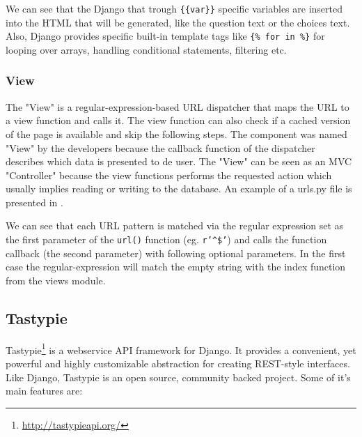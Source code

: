 

We can see that the Django that trough \texttt{\{\{var\}\}} specific variables are inserted into the HTML that will be generated, like the question text or the choices text. Also, Django provides specific built-in template tags like \texttt{\{\% for in \%\}} for looping over arrays, handling conditional statements, filtering etc.

\subsubsection{View}
\label{sub-sub-sec:view}

The "View" is a regular-expression-based URL dispatcher that maps the URL to a view function and calls it. The view function can also check if a cached version of the page is available and skip the following steps. The component was named "View" by the developers because the callback function of the dispatcher describes which data is presented to de user. The "View" can be seen as an MVC "Controller" because the view functions performs the requested action which usually implies reading or writing to the database. An example of a urls.py file is presented in .



We can see that each URL pattern is matched via the regular expression set as the first parameter of the \texttt{url()} function (eg. \texttt{r'\^{}\$'}) and calls the function callback (the second parameter) with following optional parameters. In the first case the regular-expression will match the empty string with the index function from the views module.



\subsection{Tastypie}
\label{sub-sec:tastypie}

Tastypie\footnote{\url{http://tastypieapi.org/}} is a webservice API framework for Django. It provides a convenient, yet powerful and highly customizable abstraction for creating REST-style interfaces. Like Django, Tastypie is an open source, community backed project. Some of it's main features are:

